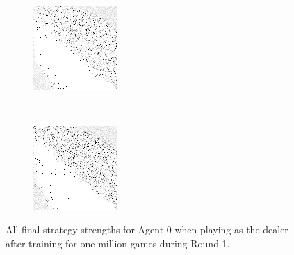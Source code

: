 \begin{figure}
\begin{subfigure}[t]{0.22\textwidth}
		\caption{\peggingmaxavggained}
	\end{subfigure}
	~
	\begin{subfigure}[t]{0.22\textwidth}
		\includegraphics[width=\textwidth]{images/findings/round1/strategies_peggingmaxmedgained.png}
		\caption{\peggingmaxmedgained}
	\end{subfigure}
	~
	\begin{subfigure}[t]{0.22\textwidth}
		\includegraphics[width=\textwidth]{images/findings/round1/strategies_peggingminavggiven.png}
		\caption{\peggingminavggiven}
	\end{subfigure}

\caption{
	All final strategy strengths for Agent 0
	when playing as the dealer
	after training for one million games during Round 1.
}
\label{fig_r1-strats}
\end{figure}
